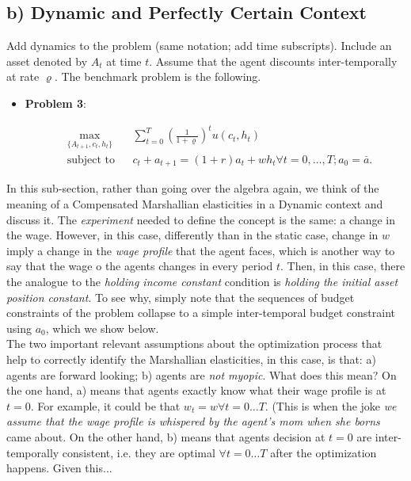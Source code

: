 \documentclass[11pt]{article}
\begin{document}
\subsection*{b) Dynamic and Perfectly Certain Context}
Add dynamics to the problem (same notation; add time subscripts). Include an asset denoted by $A_{t}$ at time $t$. Assume that the agent discounts inter-temporally at rate $\varrho $. The benchmark problem is the following. 

\begin{itemize}

\item \textbf{Problem 3}: 

\begin{equation*}
\begin{aligned}
& \underset{\{A_{t+1},c_{t},h_{t}\}}{\text{max}}
& & \sum \limits _{t=0} ^T (\frac{1}{1+\varrho})^{t} u(c_{t},h_{t}) \\
& \text{subject to}
& & c_{t}+a_{t+1}=\left( 1+r\right) a_{t}+wh_{t}\forall t=0,\ldots ,T; a_{0}=%
\overset{\_}{a}.
\end{aligned}
\end{equation*}

\end{itemize}

In this sub-section, rather than going over the algebra again, we think of the meaning of a Compensated Marshallian elasticities in a Dynamic context and discuss it. The  \textit{experiment} needed to define the concept is the same: a change in the wage. However, in this case, differently than in the static case, change in $w$ imply a change in the \textit{wage profile} that the agent faces, which is another way to say that the wage o the agents changes in every period $t$. Then, in this case, there the analogue to the \textit{holding income constant} condition is \textit{holding the initial asset position constant}. To see why, simply note that the sequences of budget constraints of the problem collapse to a simple inter-temporal budget constraint using $a_0$, which we show below. \\
\indent The two important relevant assumptions about the optimization process that help to correctly identify the Marshallian elasticities, in this case, is that: a) agents are forward looking; b) agents are \textit{not myopic}. What does this mean? On the one hand, a) means that agents exactly know what their wage profile is at $t=0$. For example, it could be that $w_{t}=w \forall t=0 \dots T$. (This is when the joke \textit{we assume that the wage profile is whispered by the agent's mom when she borns} came about. On the other hand, b) means that agents decision at $t=0$ are inter-temporally consistent, i.e. they are optimal $\forall t=0 \dots T$ after the optimization happens. Given this...
\end{document}
